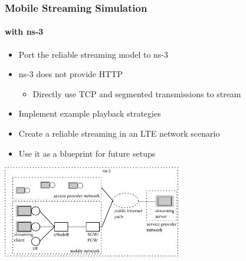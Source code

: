 \documentclass{beamer}
\begin{document}
\begin{frame}
	\frametitle{Mobile Streaming Simulation}
	\framesubtitle{with ns-3}

	\begin{itemize}
		\item Port the reliable streaming model to ns-3
		\item ns-3 does not provide HTTP
			\begin{itemize}
				\item Directly use TCP and segmented transmissions to stream
			\end{itemize}
		\item Implement example playback strategies
		\item Create a reliable streaming in an LTE network scenario
		\item Use it as a blueprint for future setups
	\end{itemize}

	\begin{center}
		\includegraphics[height=4cm]{extras/streaming-simulation.pdf}
	\end{center}

\end{frame}






	

\end{document}
